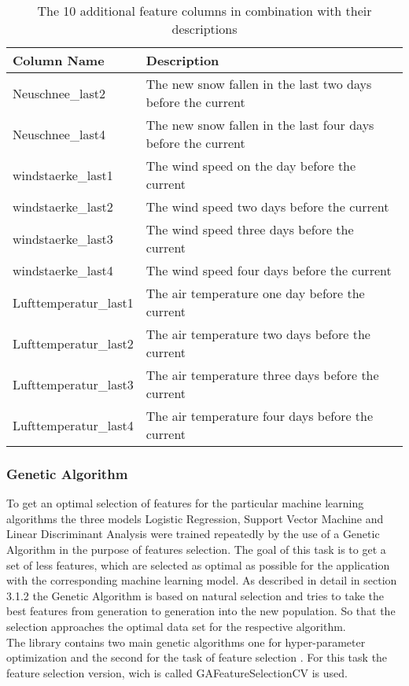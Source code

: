 \documentclass[../masterarbeit.tex]{subfiles}
\begin{document}
\begin{table}
    \centering
    \begin{tabular}{|l|l|}
    \hline
    	Column Name & Description \\ \hline
        Neuschnee\_last2 & The new snow fallen in the last two days before the current \\ \hline
        Neuschnee\_last4 & The new snow fallen in the last four days before the current \\ \hline
        windstaerke\_last1 & The wind speed on the day before the current \\ \hline
        windstaerke\_last2 & The wind speed two days before the current \\ \hline
        windstaerke\_last3 & The wind speed three days before the current \\ \hline
        windstaerke\_last4 & The wind speed four days before the current \\ \hline
        Lufttemperatur\_last1 & The air temperature one day before the current \\ \hline
        Lufttemperatur\_last2 & The air temperature two days before the current \\ \hline
        Lufttemperatur\_last3 & The air temperature three days before the current \\ \hline
        Lufttemperatur\_last4 & The air temperature four days before the current \\ \hline
    \end{tabular}
    \caption{The 10 additional feature columns in combination with their descriptions}
\end{table}









\subsubsection{Genetic Algorithm}

To get an optimal selection of features for the particular machine learning algorithms the three models Logistic Regression, Support Vector Machine and Linear Discriminant Analysis were trained repeatedly by the use of a Genetic Algorithm in the purpose of features selection. The goal of this task is to get a set of less features, which are selected as optimal as possible for the application with the corresponding machine learning model. As described in detail in section 3.1.2 the Genetic Algorithm is based on natural selection and tries to take the best features from generation to generation into the new population. So that the selection approaches the optimal data set for the respective algorithm. \\
The library contains two main genetic algorithms one for hyper-parameter optimization and the second for the task of feature selection \textcite[]{Sklearn_genetic_feature_docu:2022}. For this task the feature selection version, wich is called GAFeatureSelectionCV is used.
\end{document}
